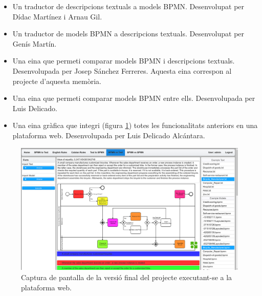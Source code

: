 \begin{itemize} 
        \item Un traductor de descripcions textuals a models BPMN. Desenvolupat per Dídac Martínez i Arnau Gil.
        \item Un traductor de models BPMN a descripcions textuals. Desenvolupat per Genís Martín.
        \item Una eina que permeti comparar models BPMN i descripcions textuals. Desenvolupada per Josep Sánchez Ferreres. Aquesta eina correspon al projecte d'aquesta memòria.
        \item Una eina que permeti comparar models BPMN entre ells. Desenvolupada per Luis Delicado.
        \item Una eina gràfica que integri (figura \ref{fig:ui}) totes les funcionalitats anteriors en una plataforma web. Desenvolupada per Luis Delicado Alcántara.
\end{itemize}

\begin{figure}[!htb]
    \centering
    \includegraphics[width=\textwidth]{figures/interficie1.png}
    \caption{Captura de pantalla de la versió final del projecte executant-se a la plataforma web.}
    \label{fig:ui}
\end{figure}

